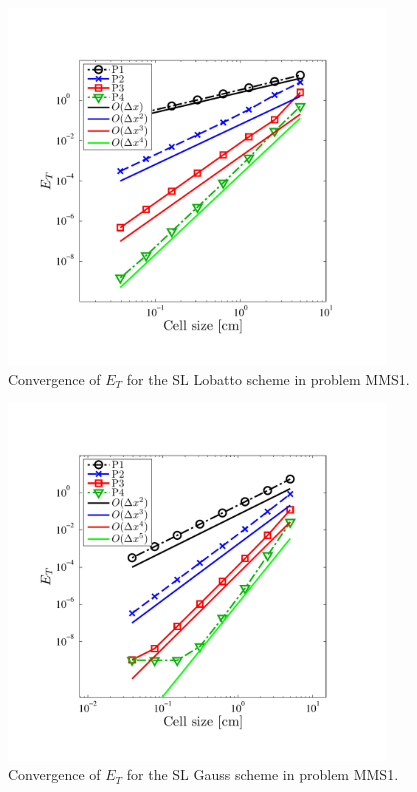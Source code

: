 \begin{figure}[!htp]
\centering
\includegraphics[width=10cm,trim=0.25in  0.5in 0.75in 0.75in,clip=true]{chapter6_grey_radtran/Dissertation_Data/MMS2_SLXS_Lobatto_temp_L2.pdf}
\caption{Convergence of $E_{T}$ for the SL Lobatto scheme in problem MMS1.}
\label{fig:mms1_lobatto_temp}
\end{figure}
%
%
\begin{figure}[!hbp]
\centering
\includegraphics[width=10cm,trim=0.25in  0.5in 0.75in 0.75in,clip=true]{chapter6_grey_radtran/Dissertation_Data/MMS2_SLXS_Gauss_temp_L2.pdf}
\caption{Convergence of $E_{T}$ for the SL Gauss scheme in problem MMS1.}
\label{fig:mms1_gauss_temp}
\end{figure}

